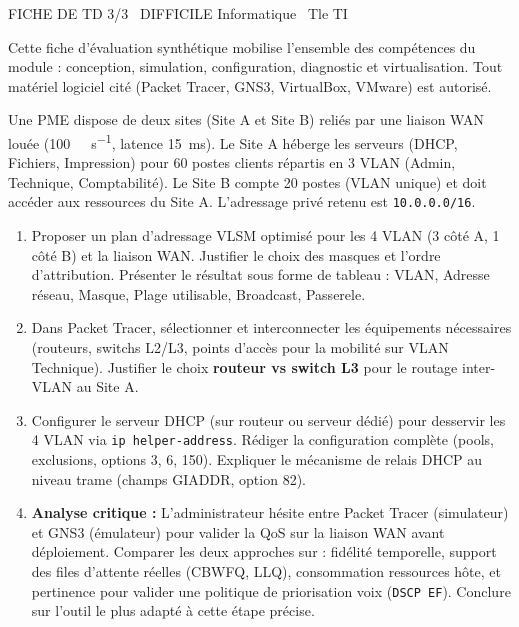 \documentclass[11pt]{article}
\begin{document}
\begin{tcolorbox}[enhanced,colback=popink,colframe=popink,arc=10pt,boxrule=0pt,left=12pt,right=12pt,top=9pt,bottom=9pt]
{\color{white}\popxbold\small FICHE DE TD 3/3 \textbullet\ DIFFICILE \hfill Informatique \textbullet\ Tle TI\par}
\end{tcolorbox}
\vspace{4pt}
Cette fiche d'évaluation synthétique mobilise l'ensemble des compétences du module : conception, simulation, configuration, diagnostic et virtualisation. Tout matériel logiciel cité (Packet Tracer, GNS3, VirtualBox, VMware) est autorisé.

\begin{exercice}
Une PME dispose de deux sites (Site A et Site B) reliés par une liaison WAN louée (\SI{100}{\mega\bit\per\second}, latence \SI{15}{\milli\second}). Le Site A héberge les serveurs (DHCP, Fichiers, Impression) pour 60 postes clients répartis en 3 VLAN (Admin, Technique, Comptabilité). Le Site B compte 20 postes (VLAN unique) et doit accéder aux ressources du Site A. L'adressage privé retenu est \texttt{10.0.0.0/16}.

\begin{enumerate}
    \item Proposer un plan d'adressage VLSM optimisé pour les 4 VLAN (3 côté A, 1 côté B) et la liaison WAN. Justifier le choix des masques et l'ordre d'attribution. Présenter le résultat sous forme de tableau : VLAN, Adresse réseau, Masque, Plage utilisable, Broadcast, Passerele.
    \item Dans Packet Tracer, sélectionner et interconnecter les équipements nécessaires (routeurs, switchs L2/L3, points d'accès pour la mobilité sur VLAN Technique). Justifier le choix \textbf{routeur vs switch L3} pour le routage inter-VLAN au Site A.
    \item Configurer le serveur DHCP (sur routeur ou serveur dédié) pour desservir les 4 VLAN via \texttt{ip helper-address}. Rédiger la configuration complète (pools, exclusions, options 3, 6, 150). Expliquer le mécanisme de relais DHCP au niveau trame (champs GIADDR, option 82).
    \item \textbf{Analyse critique :} L'administrateur hésite entre Packet Tracer (simulateur) et GNS3 (émulateur) pour valider la QoS sur la liaison WAN avant déploiement. Comparer les deux approches sur : fidélité temporelle, support des files d'attente réelles (CBWFQ, LLQ), consommation ressources hôte, et pertinence pour valider une politique de priorisation voix (\texttt{DSCP EF}). Conclure sur l'outil le plus adapté à cette étape précise.
\end{enumerate}
\end{exercice}
\end{document}
